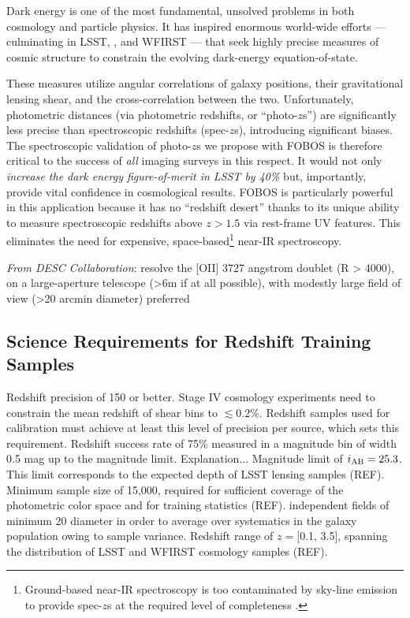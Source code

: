 \documentclass[11pt,a4paper,twoside,onecolumn,openany,final,oldfontcommands]{memoir}
\begin{document}
Dark energy is one of the most fundamental, unsolved problems in both cosmology and particle physics.  It has inspired enormous world-wide efforts --- culminating in LSST, \euclid, and WFIRST --- that seek highly precise measures of cosmic structure to constrain the evolving dark-energy equation-of-state.

These measures utilize angular correlations of galaxy positions, their gravitational lensing shear, and the cross-correlation between the two. Unfortunately, photometric distances (via photometric redshifts, or ``photo-$z$s'') are significantly less precise than spectroscopic redshifts (spec-$z$s), introducing significant biases.  The spectroscopic validation of photo-$z$s we propose with FOBOS is therefore critical to the success of \textit{all} imaging surveys in this respect. It would not only \emph{increase the dark energy figure-of-merit in LSST by 40\%} \citep{newman15} but, importantly, provide vital confidence in cosmological results.  FOBOS is particularly powerful in this application because it has no ``redshift desert'' thanks to its unique ability to measure spectroscopic redshifts above $z > 1.5$ via rest-frame UV features.  This eliminates the need for expensive, space-based\footnote{Ground-based near-IR spectroscopy is too contaminated by sky-line emission to provide spec-$z$s at the required level of completeness \citep{newman15}.} near-IR spectroscopy. 

\emph{From DESC Collaboration}: resolve the [OII] 3727 angstrom doublet (R > 4000), on a large-aperture telescope (>6m if at all possible), with modestly large field of view (>20 arcmin diameter) preferred

\subsection{Science Requirements for Redshift Training Samples}

\begin{sciencerequirement}
\reqitem Redshift precision of 150 \kms{} or better. Stage IV cosmology experiments need to constrain the mean redshift of shear bins to $\lesssim0.2\%$. Redshift samples used for calibration must achieve at least this level of precision per source, which sets this requirement. 
%
\reqitem Redshift success rate of 75\% measured in a magnitude bin of width 0.5 mag up to the magnitude limit.  Explanation...
%
\reqitem Magnitude limit of $i_{\rm AB} = 25.3$.  This limit corresponds to the expected depth of LSST lensing samples (REF).
%
\reqitem Minimum sample size of 15,000, required for sufficient coverage of the photometric color space and for training statistics (REF).
%
 independent fields of minimum 20\arcmin{} diameter in order to average over systematics in the galaxy population owing to sample variance.
%
\reqitem Redshift range of $z = $[0.1, 3.5], spanning the distribution of LSST and WFIRST cosmology samples (REF).
%
\end{sciencerequirement}
\end{document}
